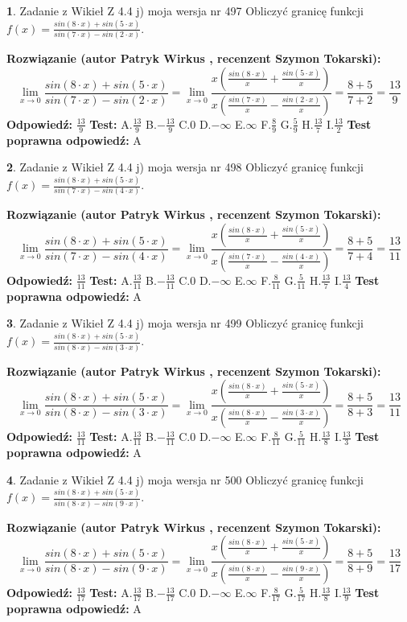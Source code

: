 \documentclass[12pt, a4paper]{article}
\theoremstyle{definition} %
\newtheorem{zad}{}
\newcommand{\zadStart}[1]{\begin{zad}#1\newline}
\newcommand{\zadStop}{\end{zad}}
\newcommand{\rozwStart}[2]{\noindent \textbf{Rozwiązanie (autor #1 , recenzent #2): }\newline}
\newcommand{\rozwStop}{\newline}
\newcommand{\odpStart}{\noindent \textbf{Odpowiedź:}\newline}
\newcommand{\odpStop}{\newline}
\newcommand{\testStart}{\noindent \textbf{Test:}\newline}
\newcommand{\testStop}{\newline}
\newcommand{\kluczStart}{\noindent \textbf{Test poprawna odpowiedź:}\newline}
\newcommand{\kluczStop}{\newline}
\begin{document}
\zadStart{Zadanie z Wikieł Z 4.4 j) moja wersja nr 497}
Obliczyć granicę funkcji $f(x)=\frac{sin(8\cdot x) +sin(5\cdot x)}{sin(7\cdot x) -sin(2\cdot x)}$.
\zadStop
\rozwStart{Patryk Wirkus}{Szymon Tokarski}
$$\lim\limits_{x\to 0}\frac{sin(8\cdot x) +sin(5\cdot x)}{sin(7\cdot x) -sin(2\cdot x)}=\lim\limits_{x\to 0}\frac{x(\frac{sin(8\cdot x)}{x}+\frac{sin(5\cdot x)}{x})}{x(\frac{sin(7\cdot x)}{x}-\frac{sin(2\cdot x)}{x})}=\frac{8+5}{7+2} = \frac{13}{9}$$
\rozwStop
\odpStart
$\frac{13}{9}$
\odpStop
\testStart
A.$\frac{13}{9}$
B.$-\frac{13}{9}$
C.$0$
D.$-\infty$
E.$\infty$
F.$\frac{8}{9}$
G.$\frac{5}{9}$
H.$\frac{13}{7}$
I.$\frac{13}{2}$
\testStop
\kluczStart
A
\kluczStop



\zadStart{Zadanie z Wikieł Z 4.4 j) moja wersja nr 498}
Obliczyć granicę funkcji $f(x)=\frac{sin(8\cdot x) +sin(5\cdot x)}{sin(7\cdot x) -sin(4\cdot x)}$.
\zadStop
\rozwStart{Patryk Wirkus}{Szymon Tokarski}
$$\lim\limits_{x\to 0}\frac{sin(8\cdot x) +sin(5\cdot x)}{sin(7\cdot x) -sin(4\cdot x)}=\lim\limits_{x\to 0}\frac{x(\frac{sin(8\cdot x)}{x}+\frac{sin(5\cdot x)}{x})}{x(\frac{sin(7\cdot x)}{x}-\frac{sin(4\cdot x)}{x})}=\frac{8+5}{7+4} = \frac{13}{11}$$
\rozwStop
\odpStart
$\frac{13}{11}$
\odpStop
\testStart
A.$\frac{13}{11}$
B.$-\frac{13}{11}$
C.$0$
D.$-\infty$
E.$\infty$
F.$\frac{8}{11}$
G.$\frac{5}{11}$
H.$\frac{13}{7}$
I.$\frac{13}{4}$
\testStop
\kluczStart
A
\kluczStop



\zadStart{Zadanie z Wikieł Z 4.4 j) moja wersja nr 499}
Obliczyć granicę funkcji $f(x)=\frac{sin(8\cdot x) +sin(5\cdot x)}{sin(8\cdot x) -sin(3\cdot x)}$.
\zadStop
\rozwStart{Patryk Wirkus}{Szymon Tokarski}
$$\lim\limits_{x\to 0}\frac{sin(8\cdot x) +sin(5\cdot x)}{sin(8\cdot x) -sin(3\cdot x)}=\lim\limits_{x\to 0}\frac{x(\frac{sin(8\cdot x)}{x}+\frac{sin(5\cdot x)}{x})}{x(\frac{sin(8\cdot x)}{x}-\frac{sin(3\cdot x)}{x})}=\frac{8+5}{8+3} = \frac{13}{11}$$
\rozwStop
\odpStart
$\frac{13}{11}$
\odpStop
\testStart
A.$\frac{13}{11}$
B.$-\frac{13}{11}$
C.$0$
D.$-\infty$
E.$\infty$
F.$\frac{8}{11}$
G.$\frac{5}{11}$
H.$\frac{13}{8}$
I.$\frac{13}{3}$
\testStop
\kluczStart
A
\kluczStop



\zadStart{Zadanie z Wikieł Z 4.4 j) moja wersja nr 500}
Obliczyć granicę funkcji $f(x)=\frac{sin(8\cdot x) +sin(5\cdot x)}{sin(8\cdot x) -sin(9\cdot x)}$.
\zadStop
\rozwStart{Patryk Wirkus}{Szymon Tokarski}
$$\lim\limits_{x\to 0}\frac{sin(8\cdot x) +sin(5\cdot x)}{sin(8\cdot x) -sin(9\cdot x)}=\lim\limits_{x\to 0}\frac{x(\frac{sin(8\cdot x)}{x}+\frac{sin(5\cdot x)}{x})}{x(\frac{sin(8\cdot x)}{x}-\frac{sin(9\cdot x)}{x})}=\frac{8+5}{8+9} = \frac{13}{17}$$
\rozwStop
\odpStart
$\frac{13}{17}$
\odpStop
\testStart
A.$\frac{13}{17}$
B.$-\frac{13}{17}$
C.$0$
D.$-\infty$
E.$\infty$
F.$\frac{8}{17}$
G.$\frac{5}{17}$
H.$\frac{13}{8}$
I.$\frac{13}{9}$
\testStop
\kluczStart
A
\kluczStop
\end{document}

